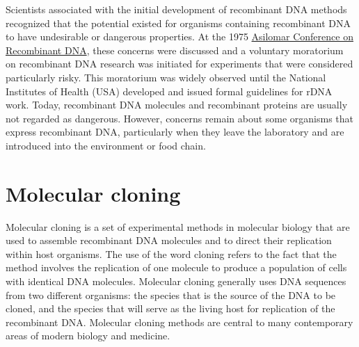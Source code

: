 Scientists associated with the initial development of recombinant DNA methods recognized that the potential existed for organisms containing recombinant DNA to have undesirable or dangerous properties. At the 1975 \href{https://en.wikipedia.org/wiki/Asilomar_Conference_on_Recombinant_DNA}{Asilomar Conference on Recombinant DNA}, these concerns were discussed and a voluntary moratorium on recombinant DNA research was initiated for experiments that were considered particularly risky. This moratorium was widely observed until the National Institutes of Health (USA) developed and issued formal guidelines for rDNA work. Today, recombinant DNA molecules and recombinant proteins are usually not regarded as dangerous. However, concerns remain about some organisms that express recombinant DNA, particularly when they leave the laboratory and are introduced into the environment or food chain.

\hypertarget{molecular-cloning}{%
\section{Molecular cloning}\label{molecular-cloning}}

Molecular cloning is a set of experimental methods in molecular biology that are used to assemble recombinant DNA molecules and to direct their replication within host organisms. The use of the word cloning refers to the fact that the method involves the replication of one molecule to produce a population of cells with identical DNA molecules. Molecular cloning generally uses DNA sequences from two different organisms: the species that is the source of the DNA to be cloned, and the species that will serve as the living host for replication of the recombinant DNA. Molecular cloning methods are central to many contemporary areas of modern biology and medicine.

